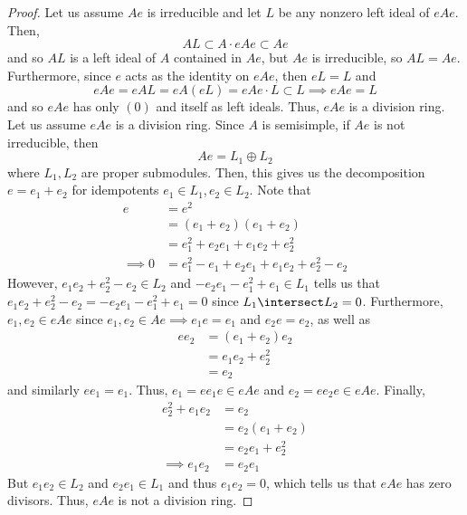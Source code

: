 \documentclass[11pt,leqno,oneside]{amsbook}
\numberwithin{thm}{section}
\begin{document}
\begin{proof}
  Let us assume \(Ae\) is irreducible and let \(L\) be any nonzero
  left ideal of \(eAe\). Then, \[
    AL \subset A \cdot eAe \subset Ae
  \]
  and so \(AL\) is a left ideal of \(A\) contained in \(Ae\), but
  \(Ae\) is irreducible, so \(AL = Ae\). Furthermore, since \(e\) acts
  as the identity on \(eAe\), then \(eL = L\) and \[
    eAe = eAL = eA(eL) = eAe \cdot L \subset L \implies eAe = L
  \]
  and so \(eAe\) has only \((0)\) and itself as left ideals. Thus,
  \(eAe\) is a division ring. \\

  Let us assume \(eAe\) is a division ring. Since \(A\) is semisimple,
  if \(Ae\) is not irreducible, then \[
    Ae = L_1 \oplus L_2
  \]
  where \(L_1, L_2\) are proper submodules. Then, this gives us the
  decomposition \(e = e_1 + e_2\) for idempotents \(e_1 \in L_1, e_2 \in
  L_2\). Note that
  \begin{align*}
    e & = e^2 \\
      &= (e_1 + e_2)(e_1 + e_2) \\
    & = e_1^2 + e_2 e_1 + e_1 e_2 + e_2^2 \\
    \implies 0 & = e_1^2 - e_1 + e_2 e_1 + e_1 e_2 + e_2^2 -e_2
  \end{align*}
  However, \(e_1 e_2 + e_2^2 - e_2 \in L_2\) and \(-e_2 e_1 - e_1^2 + e_1 \in L_1\) tells us that
  \(e_1 e_2 + e_2^2-e_2= - e_2 e_1 - e_1^2 + e_1= 0\) since \(L_1 \intersect L_2 =
  0\). Furthermore, \(e_1, e_2 \in eAe\) since \(e_1, e_2 \in Ae
  \implies e_1 e = e_1\) and \(e_2 e = e_2\), as well as
  \begin{align*}
    e e_2 & = (e_1 + e_2)e_2 \\
              & = e_1 e_2 + e_2^2 \\
              & = e_2
  \end{align*}
  and similarly \(e e_1 = e_1\). Thus, \(e_1 = e e_1 e \in eAe\) and
  \(e_2 = e e_2 e \in eAe\). Finally,
  \begin{align*}
    e_2^2 + e_1 e_2 & = e_2 \\
                    & = e_2(e_1+e_2) \\
                    & = e_2 e_1 +  e_2^2 \\
    \implies e_1 e_2 & = e_2 e_1
  \end{align*}
  But \(e_1 e_2 \in L_2\) and \(e_2 e_1 \in L_1\) and thus \(e_1 e_2 =
  0\), which tells us that \(eAe\) has zero divisors. Thus, \(eAe\) is
  not a division ring.

\end{proof}
\end{document}
